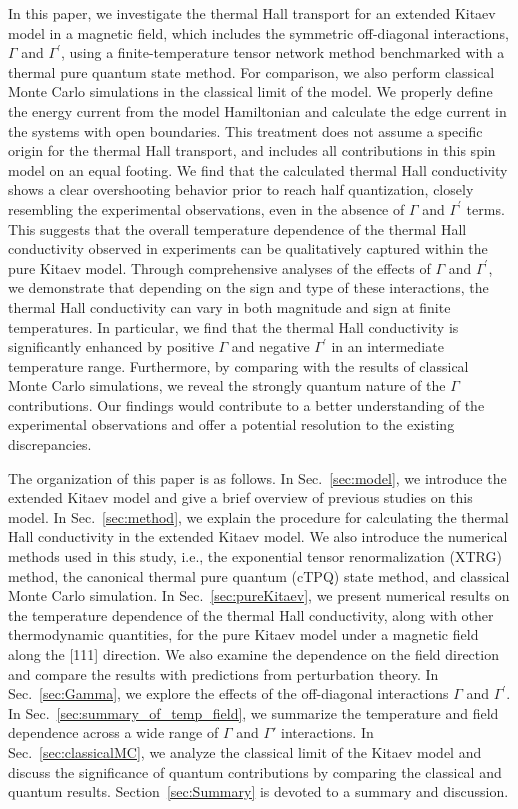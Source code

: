 \documentclass[twocolumn,superscriptaddress,showpacs, longbibliography, aps, prx]{revtex4-2}
\begin{document}
In this paper, we investigate the thermal Hall transport for an extended Kitaev model in a magnetic field, which includes the symmetric off-diagonal interactions, $\Gamma$ and $\Gamma^\prime$, using a finite-temperature tensor network method benchmarked with a thermal pure quantum state method. 
For comparison, we also perform classical Monte Carlo simulations in the classical limit of the model. 
We properly define the energy current from the model Hamiltonian and calculate the edge current in the systems with open boundaries. 
This treatment does not assume a specific origin for the thermal Hall transport, and includes all contributions in this spin model on an equal footing. 
We find that the calculated thermal Hall conductivity shows a clear overshooting behavior prior to reach half quantization, closely resembling the experimental observations, even in the absence of $\Gamma$ and $\Gamma^\prime$ terms. 
This suggests that the overall temperature dependence of the thermal Hall conductivity observed in experiments can be qualitatively captured within the pure Kitaev model. 
Through comprehensive analyses of the effects of $\Gamma$ and $\Gamma^\prime$, we demonstrate that depending on the sign and type of these interactions, the thermal Hall conductivity can vary in both magnitude and sign at finite temperatures. 
In particular, we find that the thermal Hall conductivity is significantly enhanced by positive $\Gamma$ and negative $\Gamma^\prime$ in an intermediate temperature range. 
Furthermore, by comparing with the results of classical Monte Carlo simulations, we reveal the strongly quantum nature of the $\Gamma$ contributions. 
Our findings would contribute to a better understanding of the experimental observations and offer a potential resolution to the existing discrepancies. 

The organization of this paper is as follows. 
In Sec.~\ref{sec:model}, we introduce the extended Kitaev model and give a brief overview of previous studies on this model. 
In Sec.~\ref{sec:method}, we explain the procedure for calculating the thermal Hall conductivity in the extended Kitaev model. 
We also introduce the numerical methods used in this study, i.e., the exponential tensor renormalization (XTRG) method, the canonical thermal pure quantum (cTPQ) state method, and classical Monte Carlo simulation.
In Sec.~\ref{sec:pureKitaev}, we present numerical results on the temperature dependence of the thermal Hall conductivity, along with other thermodynamic quantities, for the pure Kitaev model under a magnetic field along the [111] direction. 
We also examine the dependence on the field direction and compare the results with predictions from perturbation theory. 
In Sec.~\ref{sec:Gamma}, we explore the effects of the off-diagonal interactions $\Gamma$ and $\Gamma^{\prime}$. 
In Sec.~\ref{sec:summary_of_temp_field}, we summarize the temperature and field dependence across a wide range of $\Gamma$ and $\Gamma'$ interactions.
In Sec.~\ref{sec:classicalMC}, we analyze the classical limit of the Kitaev model and discuss the significance of quantum contributions by comparing the classical and quantum results.
Section~\ref{sec:Summary} is devoted to a summary and discussion.
\end{document}
